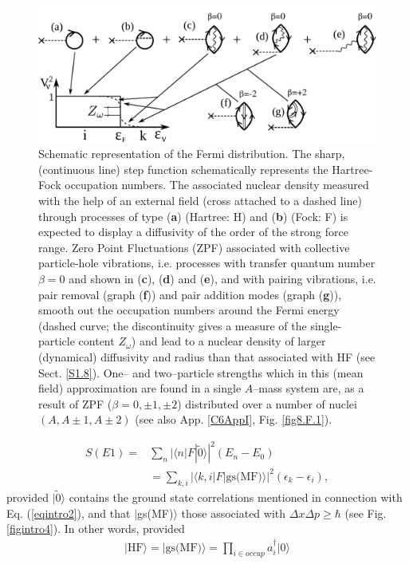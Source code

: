 \begin{figure}
\centerline {
\includegraphics*[width=12cm]{introduccion/figs/fig1_2_2}
}
\caption{Schematic representation of the Fermi distribution. The sharp, (continuous line)  step function schematically represents the Hartree-Fock occupation numbers. The associated nuclear density measured with the help of an external field (cross attached to a dashed line) through processes of type (\textbf{a}) (Hartree: H) and (\textbf{b}) (Fock: F) is expected to display a diffusivity of the order of the strong force range. Zero Point Fluctuations (ZPF) associated with collective particle-hole vibrations, i.e. processes with transfer quantum number $\beta=0$  and shown in (\textbf{c}), (\textbf{d}) and (\textbf{e}), and with pairing vibrations, i.e. pair removal (graph (\textbf{f})) and pair addition modes (graph (\textbf{g})), smooth out the occupation numbers around the Fermi energy (dashed curve; the discontinuity gives a measure of the single-particle content $Z_\omega$) and lead to a  nuclear density of larger (dynamical) diffusivity and radius than that associated with HF (see Sect. \ref{S1.8}). One-- and two--particle strengths which in this (mean field) approximation are found in a single $A$--mass system are, as a result of ZPF ($\beta=0,\pm 1, \pm 2$) distributed over a number of nuclei $(A, A\pm 1, A\pm 2)$ (see also App. \ref{C6AppI}, Fig. \ref{fig8.F.1}).}
\label{fig1.2.2}
\end{figure}
\begin{align}\label{eqintro6}
\nonumber S(E1)=&\sum_n |\langle n|F|\tilde 0\rangle|^2(E_n-E_0)\\
&=\sum_{k,i}|\langle k,i|F|\text{gs(MF)}\rangle|^2(\epsilon_{k}-\epsilon_i),
\end{align}
provided $|\tilde 0\rangle$ contains the ground state correlations mentioned in connection with Eq. (\ref{eqintro2}), and that $|$gs(MF)$\rangle$ those associated with $\Delta x\Delta p\geq \hbar$ (see Fig. \ref{figintro4}). In other words, provided
\begin{align}
|\text{HF}\rangle=|\text{gs(MF)}\rangle=\prod_{i\in occup}a^\dagger_i |0\rangle
\end{align}
